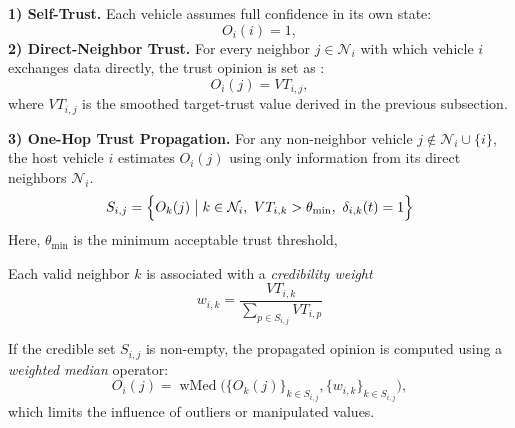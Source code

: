 \documentclass{ifacconf}
\begin{document}
\vspace{1ex}
\noindent\textbf{1) Self-Trust.}
Each vehicle assumes full confidence in its own state:
\begin{equation}
O_i(i) = 1 ,
\end{equation}
\vspace{1ex}
\noindent\textbf{2) Direct-Neighbor Trust.}
For every neighbor $j\in\mathcal{N}_i$ with which vehicle $i$ exchanges data directly, the trust opinion is set as :
\begin{equation}
O_i(j) = VT_{i,j} ,
\end{equation}
where $VT_{i,j}$ is the smoothed target-trust value derived in the previous subsection.

\vspace{1ex}
\noindent\textbf{3) One-Hop Trust Propagation.}
For any non-neighbor vehicle $j\notin\mathcal{N}_i\cup\{i\}$, 
the host vehicle $i$ estimates $O_i(j)$ using only information from its direct neighbors $\mathcal{N}_i$.
\begin{equation}
S_{i,j} =
\Bigl\{ O_k(j)
\;\big|\;
k \in \mathcal{N}_i,~
VT_{i,k} > \theta_{\min},~
\delta_{i,k}(t) = 1\Bigr\}
\label{eq:Sij}
\end{equation}
Here, $\theta_{\min}$ is the minimum acceptable trust threshold, 

Each valid neighbor $k$ is associated with a \emph{credibility weight} 
\begin{equation}
w_{i,k} = \frac{VT_{i,k}}{\sum_{p \in S_{i,j}} VT_{i,p}}
\label{eq:weight}
\end{equation}

If the credible set $S_{i,j}$ is non-empty, the propagated opinion is computed 
using a \emph{weighted median} operator:
\begin{equation}
O_i(j) = \operatorname{wMed}
\bigl(
\{ O_k(j) \}_{k\in S_{i,j}},
\{ w_{i,k} \}_{k\in S_{i,j}}
\bigr),
\label{eq:weighted_median}
\end{equation}
which limits the influence of outliers or manipulated values.
\end{document}
